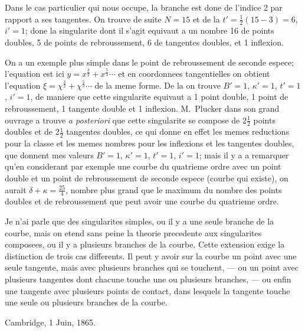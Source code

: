\documentclass[11pt,a4paper]{article}
\theoremstyle{plain}
\begin{document}
Dans le cas particulier qui nous occupe, la branche est done de l'indice 2 par rapport a ses tangentes. On trouve de suite $N = 15$ et de la $t' = \frac12(15 - 3) = 6$, $i' = 1$; done la singularite dont il s'agit equivaut a un nombre 16 de points doubles, 5 de points de rebroussement, 6 de tangentes doubles, et 1 inflexion.

On a un exemple plus simple dans le point de rebroussement de seconde espece; l'equation est ici $y = x^{\frac32} + x^{\frac53} \cdots$ et en coordonnees tangentielles on obtient l'equation $\xi = \chi^{\frac32} + \chi^{\frac53} \cdots$ de la meme forme. De la on trouve $B' = 1$, $\kappa' = 1$, $t' = 1$, $i' = 1$, de maniere que cette singularite equivaut a 1 point double, 1 point de rebroussement, 1 tangente double et 1 inflexion. M.~Plucker dans son grand ouvrage a trouve \textit{a posteriori} que cette singularite se compose de $2\frac12$ points doubles et de $2\frac12$ tangentes doubles, ce qui donne en effet les memes reductions pour la classe et les memes nombres pour les inflexions et les tangentes doubles, que donnent mes valeurs $B' = 1$, $\kappa' = 1$, $t' = 1$, $i' = 1$; mais il y a a remarquer qu'en considerant par exemple une courbe du quatrieme ordre avec un point double et un point de rebroussement de seconde espece (courbe qui existe), on aurait $\delta + \kappa = \frac{25}{4}$, nombre plus grand que le maximum du nombre des points doubles et de rebroussement que peut avoir une courbe du quatrieme ordre.

Je n'ai parle que des singularites simples, ou il y a une seule branche de la courbe, mais on etend sans peine la theorie precedente aux singularites composees, ou il y a plusieurs branches de la courbe. Cette extension exige la distinction de trois cas differents. Il peut y avoir sur la courbe un point avec une seule tangente, mais avec plusieurs branches qui se touchent, --- ou un point avec plusieurs tangentes dont chacune touche une ou plusieurs branches, --- ou enfin une tangente avec plusieurs points de contact, dans lesquels la tangente touche une seule ou plusieurs branches de la courbe.

\begin{flushright}
Cambridge, 1 Juin, 1865.
\end{flushright}

\vspace{1cm}

\end{document}
